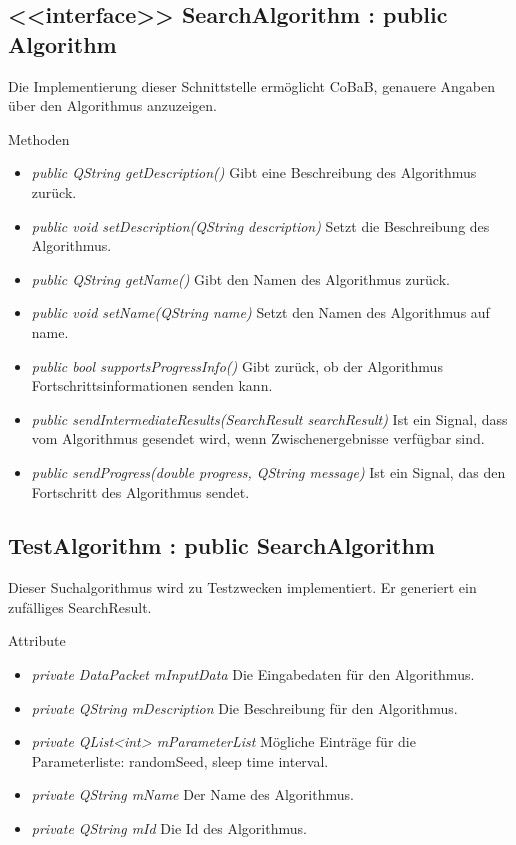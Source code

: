 \subsection*{<<interface>> SearchAlgorithm : public Algorithm}
Die Implementierung dieser Schnittstelle ermöglicht CoBaB, genauere Angaben über den Algorithmus anzuzeigen.

Methoden
\begin{itemize}
\item\textit{public QString getDescription()} Gibt eine Beschreibung des Algorithmus zurück.
\item\textit{public void setDescription(QString description)} Setzt die Beschreibung des Algorithmus.
\item\textit{public QString getName()} Gibt den Namen des Algorithmus zurück.
\item\textit{public void setName(QString name)} Setzt den Namen des Algorithmus auf name.
\item\textit{public bool supportsProgressInfo()} Gibt zurück, ob der Algorithmus Fortschrittsinformationen senden kann.
\item\textit{public sendIntermediateResults(SearchResult searchResult)} Ist ein Signal, dass vom Algorithmus gesendet wird, wenn Zwischenergebnisse verfügbar sind.
\item\textit{public sendProgress(double progress, QString message)} Ist ein Signal, das den Fortschritt des Algorithmus sendet.
\end{itemize}

\subsection*{TestAlgorithm : public SearchAlgorithm}
Dieser Suchalgorithmus wird zu Testzwecken implementiert. Er generiert ein zufälliges SearchResult.

Attribute
\begin{itemize}
\item\textit{private DataPacket mInputData} Die Eingabedaten für den Algorithmus.
\item\textit{private QString mDescription} Die Beschreibung für den Algorithmus.
\item\textit{private QList<int> mParameterList} Mögliche Einträge für die Parameterliste: randomSeed, sleep time interval.
\item\textit{private QString mName} Der Name des Algorithmus.
\item\textit{private QString mId} Die Id des Algorithmus.
\end{itemize}


